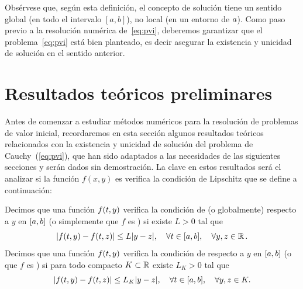 Obsérvese que, según esta definición, el
concepto de solución tiene un sentido global (en todo el intervalo
$[a,b]$), no local (en un entorno de $\ta$).
Como paso previo a la resolución numérica de~\eqref{eq:pvi}, deberemos
garantizar que el problema~\eqref{eq:pvi} está bien planteado, es
decir asegurar la existencia y unicidad de solución en el sentido
anterior. 

\section{Resultados teóricos preliminares}
\label{sec:tema4:resultados-teoricos}

Antes de comenzar a estudiar métodos numéricos para la resolución de
problemas de valor inicial, recordaremos en esta sección algunos
resultados teóricos relacionados con la existencia y unicidad de
solución del problema de Cauchy~(\ref{eq:pvi}), que han sido adaptados
a las necesidades de las siguientes secciones y serán dados sin
demostración. La clave en estos resultados será el analizar si la
función $f(x,y)$ es verifica la condición de Lipschitz que se define a
continuación:

\begin{definition}
  \label{def:lipschitz}
  Decimos que una función $f(\tt,y)$ verifica la condición de
   (o globalmente) respecto a $y$ en
    $[\ta,\tb]$ (o simplemente que $f$ es \globLipschitz)
    si existe $L>0$ tal que
  \begin{equation*}
    |f(\tt,y) - f(\tt,z)| \le L |y-z|, \quad \forall \tt\in [\ta,\tb],
    \quad  \forall y,z\in \Rset.
  \end{equation*}
  Decimos que una función $f(\tt,y)$ verifica la condición de
   respecto a $y$ en
  $[\ta,\tb]$ (o que $f$ es \locLipschitz) si para todo compacto
  $K\subset\Rset$ existe $L_K>0$ tal que
  \begin{equation*}
    |f(\tt,y) - f(\tt,z)| \le L_K |y-z|, \quad \forall \tt\in [\ta,\tb],
    \quad  \forall y,z\in K.
  \end{equation*}
\end{definition}

